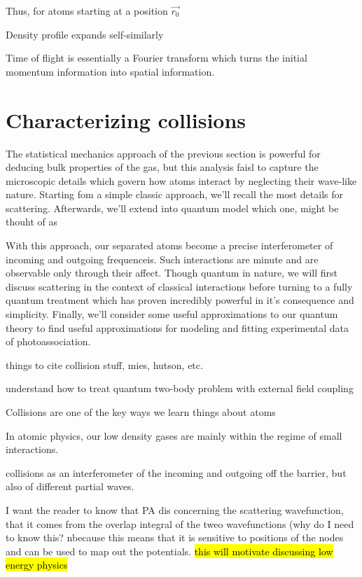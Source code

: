 Thus, for atoms starting at a position $\vec{r_0}$ 

Density profile expands self-similarly 

Time of flight is essentially a Fourier transform which turns the initial momentum information into spatial information.



\section{Characterizing collisions} \label{sec:cold_collisions}
The statistical mechanics approach of the previous section is powerful for deducing bulk properties of the gas, but this analysis faisl to capture the microscopic details which govern how atoms interact by neglecting their wave-like nature. Starting fom a simple classic approach, we'll recall the most details for scattering. Afterwards, we'll extend into quantum model which one, might be thouht of as 

With this approach, our separated atoms become a precise interferometer of incoming and outgoing frequenceis. 
Such interactions are minute and are observable only through their affect. 
Though quantum in nature, we will first discuss scattering in the context of classical interactions before turning to a fully quantum treatment which has proven incredibly powerful in it's consequence and simplicity. 
Finally, we'll consider some useful approximations to our quantum theory to find useful approximations for modeling and fitting experimental data of photoassociation. 

things to cite
collision stuff, mies, hutson, etc.

understand how to treat quantum two-body problem with external field coupling

Collisions are one of the key ways we learn things about atoms 

In atomic physics, our low density gases are mainly within the regime of small interactions. 

collisions as an interferometer of the incoming and outgoing off the barrier, but also of different partial waves.

I want the reader to know that PA dis concerning the scattering wavefunction, that it comes from the overlap integral of the tweo wavefunctions (why do I need to know this? nbecause this means that it is sensitive to positions of the nodes and can be used to map out the potentials. \hl{this will motivate discussing low energy physics}


